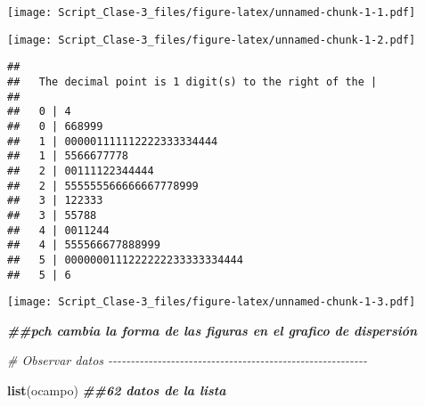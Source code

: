 \documentclass[
]{article}
\newenvironment{Shaded}{\begin{snugshade}}{\end{snugshade}}
\newcommand{\AttributeTok}[1]{\textcolor[rgb]{0.13,0.29,0.53}{#1}}
\newcommand{\CommentTok}[1]{\textcolor[rgb]{0.56,0.35,0.01}{\textit{#1}}}
\newcommand{\DecValTok}[1]{\textcolor[rgb]{0.00,0.00,0.81}{#1}}
\newcommand{\DocumentationTok}[1]{\textcolor[rgb]{0.56,0.35,0.01}{\textbf{\textit{#1}}}}
\newcommand{\FunctionTok}[1]{\textcolor[rgb]{0.13,0.29,0.53}{\textbf{#1}}}
\newcommand{\NormalTok}[1]{#1}
\newcommand{\SpecialCharTok}[1]{\textcolor[rgb]{0.81,0.36,0.00}{\textbf{#1}}}
\newcommand{\StringTok}[1]{\textcolor[rgb]{0.31,0.60,0.02}{#1}}
\begin{document}
\texttt{[image: Script\_Clase-3\_files/figure-latex/unnamed-chunk-1-1.pdf]}

\begin{Shaded}
\end{Shaded}

\texttt{[image: Script\_Clase-3\_files/figure-latex/unnamed-chunk-1-2.pdf]}

\begin{Shaded}
\end{Shaded}

\begin{verbatim}
## 
##   The decimal point is 1 digit(s) to the right of the |
## 
##   0 | 4
##   0 | 668999
##   1 | 000001111112222333334444
##   1 | 5566677778
##   2 | 00111122344444
##   2 | 555555566666667778999
##   3 | 122333
##   3 | 55788
##   4 | 0011244
##   4 | 555566677888999
##   5 | 0000000111222222233333334444
##   5 | 6
\end{verbatim}

\begin{Shaded}
\end{Shaded}

\texttt{[image: Script\_Clase-3\_files/figure-latex/unnamed-chunk-1-3.pdf]}

\begin{Shaded}
\begin{Highlighting}[]
 \DocumentationTok{\#\#pch cambia la forma de las figuras en el grafico de dispersión}

\CommentTok{\# Observar datos {-}{-}{-}{-}{-}{-}{-}{-}{-}{-}{-}{-}{-}{-}{-}{-}{-}{-}{-}{-}{-}{-}{-}{-}{-}{-}{-}{-}{-}{-}{-}{-}{-}{-}{-}{-}{-}{-}{-}{-}{-}{-}{-}{-}{-}{-}{-}{-}{-}{-}{-}{-}{-}{-}{-}{-}{-}{-}}

\FunctionTok{list}\NormalTok{(ocampo) }\DocumentationTok{\#\#62 datos de la lista}
\end{Highlighting}
\end{Shaded}
\end{document}
